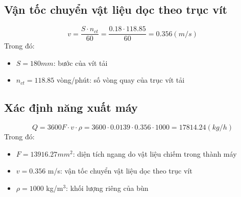 \subsection{Vận tốc chuyển vật liệu dọc theo trục vít}
\[
    v = \frac{S\cdot n_{ct}}{60} = \frac{0.18\cdot 118.85}{60} = 0.356 (m/s)
\]
Trong đó: 
\begin{itemize}
    \item $S = 180 mm$: bước của vít tải
    \item $n_{ct} = 118.85$ vòng/phút: số vòng quay của trục vít tải
\end{itemize}
\subsection{Xác định năng xuất máy}
\[
    Q = 3600F\cdot v\cdot \rho = 3600\cdot 0.0139\cdot 0.356\cdot 1000 = 17814.24 (kg/h)
\]
Trong đó:
\begin{itemize}
    \item $F = 13916.27 mm^2$: diện tích ngang do vật liệu chiếm trong thành máy
    \item $v = 0.356$ m/s: vận tốc chuyển vật liệu dọc theo trục vít
    \item $\rho = 1000$ kg/m$^3$: khối lượng riêng của bùn
\end{itemize}

